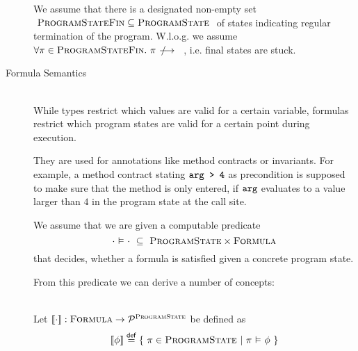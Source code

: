 \begin{description}
    We assume that there is a designated non-empty set $~\textup{\textsc{ProgramStateFin}} \subseteq \textup{\textsc{ProgramState}}~$ of states indicating regular termination of the program.
    W.l.o.g. we assume $\forall \pi \in \setProgramStateFin.~ \sstepStuck{\pi}$, i.e. final states are stuck.
    \begin{comment}
    Optionally, there may be a subset $~\setProgramStateEx \subseteq \setProgramStateFin~$ of states indicating exceptional termination of the program.
    To simplify reasoning about exceptional states, we assume $$\forall \pi_X \in \setProgramStateEx, \phi \in \setFormula.~ \evalphiGen{\pi_X}{\phi}$$ and something with special statement set?
    
    
    \end{comment}
    
\item[Formula Semantics]~\\
    While types restrict which values are valid for a certain variable,
    formulas restrict which program states are valid for a certain point during execution. 

    They are used for annotations like method contracts or invariants.
    For example, a method contract stating $\textup{\texttt{arg > 4}}$ as precondition is supposed to make sure that the method is only entered, if $\textup{\texttt{arg}}$ evaluates to a value larger than $4$ in the program state at the call site.
    
    We assume that we are given a computable predicate
    \begin{displaymath}
    \cdot \,\,{\vDash}\,\, \cdot ~\subseteq~ \textup{\textsc{ProgramState}} \times \textup{\textsc{Formula}}
    \end{displaymath}
    that decides, whether a formula is satisfied given a concrete program state.
    
    From this predicate we can derive a number of concepts:
    
    \begin{definition}~\\
        \label{def:frm-den-sem}
        Let $\llbracket {\cdot} \rrbracket : \textup{\textsc{Formula}} \rightarrow \mathcal{P}^{\textup{\textsc{ProgramState}}}$ be defined as
        \begin{displaymath}
        \llbracket {\phi} \rrbracket \overset{\textup{\textmd{\textsf{def}}}}{=} \{~ \pi \in \textup{\textsc{ProgramState}} ~|~ \pi \,\,{\vDash}\,\, \phi ~\}
        \end{displaymath}
    \end{definition}
        

\end{description}
